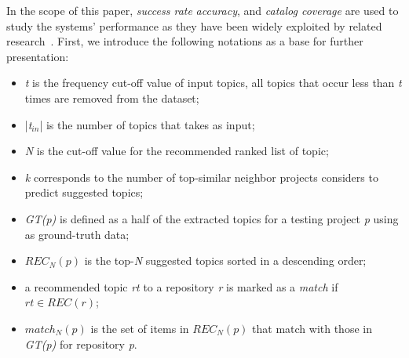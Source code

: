In the scope of this paper, \emph{success rate} \emph{accuracy}, and \emph{catalog coverage} are used to study the systems' performance as they have been widely exploited by related research~\cite{Robillard:2014:RSS:2631387}. 
First, we introduce the following notations as a base for further presentation:%
\begin{itemize}[noitemsep,topsep=0pt]
	\item \emph{t} is the frequency cut-off value of input topics, \ie all topics that occur less than \emph{t} times are removed from the dataset;
	\item |\emph{t$_{in}$}| is the number of topics that \TF takes as input;
	\item \emph{N} is the cut-off value for the recommended ranked list of topic;%
	\item \emph{k} corresponds to the number of top-similar neighbor projects \TF considers to predict suggested topics;
	\item \emph{GT(p)} is defined as a half of the extracted topics for a testing project \emph{p} using as ground-truth data;%
	\item $REC_{N}(p)$ is the top-\emph{N}  suggested topics sorted in a descending order;%
	\item a recommended topic \emph{rt} to a repository \emph{r} is marked as a \emph{match} if $rt \in REC(r)$;
	\item  $match_{N}(p)$ is the set of items in $REC_{N}(p)$ that match with those in \emph{GT(p)} for repository \emph{p}.
\end{itemize}

